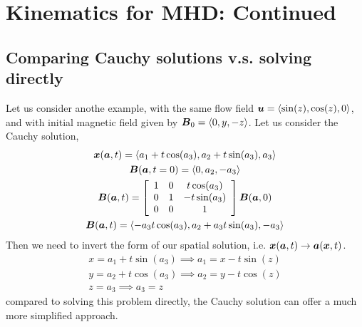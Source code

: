 \documentclass{article}
\begin{document}
\section{Kinematics for MHD: Continued}

\subsection{Comparing Cauchy solutions v.s. solving directly}
Let us consider anothe example, with the same flow field $\boldsymbol{u} = \left<\sin(z),
\cos(z), 0\right>$, and with initial magnetic field given by $\boldsymbol{B}_0 = \left<0, y,
-z\right>$. Let us consider the Cauchy solution, 
\begin{gather*}
    \boldsymbol{x}(\boldsymbol{a}, t) = \left<a_1 + t\cos(a_3), a_2 + t\sin(a_3), a_3\right>\\
    \boldsymbol{B}(\boldsymbol{a}, t=0) = \left<0, a_2, -a_3\right>\\
    \boldsymbol{B}(\boldsymbol{a}, t) = \left[\begin{array}{c c c}
        1 & 0 & t\cos(a_3)\\
        0 & 1 & -t\sin(a_3)\\
        0 & 0 & 1
        \end{array}\right]\boldsymbol{B}(\boldsymbol{a}, 0)\\
    \boldsymbol{B}(\boldsymbol{a},t) = \left< -a_3t\cos(a_3), a_2 + a_3t\sin(a_3), -a_3\right>
\end{gather*}
Then we need to invert the form of our spatial solution, i.e. $\boldsymbol{x}(\boldsymbol{a},t) \to
\boldsymbol{a}(\boldsymbol{x}, t)$. 
\begin{gather*}
    x = a_1 +t\sin(a_3) \implies a_1 = x - t\sin(z)\\
    y = a_2 + t\cos(a_3) \implies a_2 = y - t\cos(z)\\
    z = a_3  \implies a_3 = z
\end{gather*}
compared to solving this problem directly, the Cauchy solution can offer a much
more simplified approach. 
\end{document}
